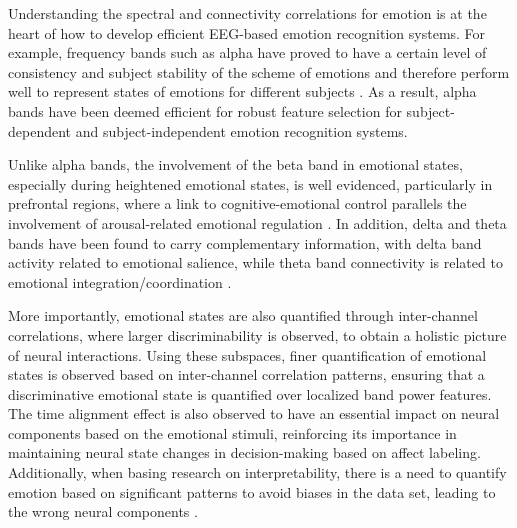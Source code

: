 \documentclass{WileyMSP-template}
\begin{document}
Understanding the spectral and connectivity correlations for emotion is at the heart of how to develop efficient EEG-based emotion recognition systems. For example, frequency bands such as alpha have proved to have a certain level of consistency and subject stability of the scheme of emotions and therefore perform well to represent states of emotions for different subjects \cite{geng2025dlreview}. As a result, alpha bands have been deemed efficient for robust feature selection for subject-dependent and subject-independent emotion recognition systems.

Unlike alpha bands, the involvement of the beta band in emotional states, especially during heightened emotional states, is well evidenced, particularly in prefrontal regions, where a link to cognitive-emotional control parallels the involvement of arousal-related emotional regulation \cite{sun2022_db_dgcn_atffn}. In addition, delta and theta bands have been found to carry complementary information, with delta band activity related to emotional salience, while theta band connectivity is related to emotional integration/coordination \cite{zhang2023_multifreq_fc_emotion}.

More importantly, emotional states are also quantified through inter-channel correlations, where larger discriminability is observed, to obtain a holistic picture of neural interactions. Using these subspaces, finer quantification of emotional states is observed based on inter-channel correlation patterns, ensuring that a discriminative emotional state is quantified over localized band power features\cite{choong2021_corr_alpha_beta_gamma}. The time alignment effect is also observed to have an essential impact on neural components based on the emotional stimuli, reinforcing its importance in maintaining neural state changes in decision-making based on affect labeling\cite{liu2018_realtime_movie_induced}. Additionally, when basing research on interpretability, there is a need to quantify emotion based on significant patterns to avoid biases in the data set, leading to the wrong neural components \cite{qing2019_interpretable_eeg_emotion}.
\end{document}
